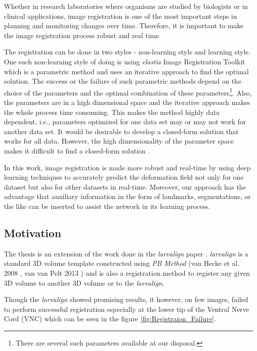 \documentclass{article}
\begin{document}
			
	Whether in research laboratories where organisms are studied by biologists or in clinical applications, image registration is one of the most important steps in planning and monitoring changes over time. Therefore, it is important to make the image registration process robust and real time. \newline
	
	The registration can be done in two styles - non-learning style and learning style.	One such non-learning style of doing is using \emph{elastix} Image Registration Toolkit which is a parametric method and uses an iterative approach to find the optimal solution. The success or the failure of such parametric methods depend on the choice of the parameters and the optimal combination of these parameters\footnote{There are several such parameters available at our disposal.}. Also, the parameters are in a high dimensional space and the iterative approach makes the whole process time consuming. This makes the method highly data dependent, i.e., parameters optimized for one data set may or may not work for another data set. It would be desirable to develop a closed-form solution that works for all data. However, the high dimensionality of the parameter space makes it difficult to find a closed-form solution \cite{Fu_2020}. \newline
	
	In this work, image registration is made more robust and real-time by using deep learning techniques to accurately predict the deformation field not only for one dataset but also for other datasets in real-time. Moreover, our approach has the advantage that auxiliary information in the form of landmarks, segmentations, or the like can be inserted to assist the network in its learning process.	\newpage

	\subsection{Motivation}
	The thesis is an extension of the work done in the \emph{larvalign} paper \cite{Mu_2018}. \emph{larvalign} is a standard 3D volume template constructed using \emph{PB Method} (van Hecke et al. 2008 \cite{Hecke_2008}, van van Pelt 2013 \cite{Pelt_2013}) and is also a registration method to register any given 3D volume to another 3D volume or to the \emph{larvalign}. \newline
	
	Though the \emph{larvalign} showed promising results, it however, on few images, failed to perform successful registration especially at the lower tip of the Ventral Nerve Cord (VNC) which can be seen in the figure \ref{fig:Registraion_Failure}.
	
\end{document}
